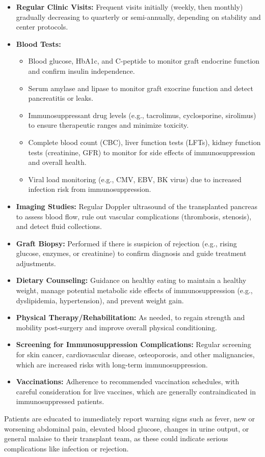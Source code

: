 \begin{itemize}
  \item \textbf{Regular Clinic Visits:} Frequent visits initially (weekly, then monthly) gradually decreasing to quarterly or semi-annually, depending on stability and center protocols.
  \item \textbf{Blood Tests:}
    \begin{itemize}
      \item Blood glucose, HbA1c, and C-peptide to monitor graft endocrine function and confirm insulin independence.
      \item Serum amylase and lipase to monitor graft exocrine function and detect pancreatitis or leaks.
      \item Immunosuppressant drug levels (e.g., tacrolimus, cyclosporine, sirolimus) to ensure therapeutic ranges and minimize toxicity.
      \item Complete blood count (CBC), liver function tests (LFTs), kidney function tests (creatinine, GFR) to monitor for side effects of immunosuppression and overall health.
      \item Viral load monitoring (e.g., CMV, EBV, BK virus) due to increased infection risk from immunosuppression.
    \end{itemize}
  \item \textbf{Imaging Studies:} Regular Doppler ultrasound of the transplanted pancreas to assess blood flow, rule out vascular complications (thrombosis, stenosis), and detect fluid collections.
  \item \textbf{Graft Biopsy:} Performed if there is suspicion of rejection (e.g., rising glucose, enzymes, or creatinine) to confirm diagnosis and guide treatment adjustments.
  \item \textbf{Dietary Counseling:} Guidance on healthy eating to maintain a healthy weight, manage potential metabolic side effects of immunosuppression (e.g., dyslipidemia, hypertension), and prevent weight gain.
  \item \textbf{Physical Therapy/Rehabilitation:} As needed, to regain strength and mobility post-surgery and improve overall physical conditioning.
  \item \textbf{Screening for Immunosuppression Complications:} Regular screening for skin cancer, cardiovascular disease, osteoporosis, and other malignancies, which are increased risks with long-term immunosuppression.
  \item \textbf{Vaccinations:} Adherence to recommended vaccination schedules, with careful consideration for live vaccines, which are generally contraindicated in immunosuppressed patients.
\end{itemize}
Patients are educated to immediately report warning signs such as fever, new or worsening abdominal pain, elevated blood glucose, changes in urine output, or general malaise to their transplant team, as these could indicate serious complications like infection or rejection.

